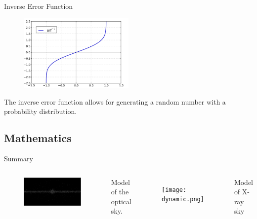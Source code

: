 \documentclass[12pt, aspectratio=169]{beamer}
\begin{document}
\begin{frame}{Inverse Error Function}
  \begin{figure}
       \includegraphics[width=0.5\textwidth]{erf_inv.svg.png}
  \end{figure}
  \centering
  The inverse error function allows for generating a random number with a probability distribution. 
\end{frame}

\subsection{Mathematics}


\begin{frame}{Summary}
  \begin{columns}
    \centering
    \begin{figure}
      \includegraphics[width=\textwidth]{static.png}
    \end{figure}
    Model of the optical sky.
    \centering
    \begin{figure}
      \texttt{[image: dynamic.png]}
    \end{figure}
    Model of X-ray sky
  \end{columns}
\end{frame}
\end{document}
